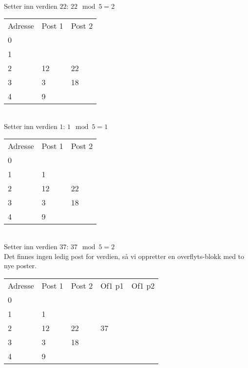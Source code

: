 ~\\
Setter inn verdien $22$: $22 \mod 5 = 2$\\
\begin{tabular}{|l|l|l|}
    \hline
    Adresse & Post 1 & Post 2 \\
    0       & ~      & ~      \\
    1       & ~      & ~      \\
    2       & 12     & 22     \\
    3       & 3      & 18     \\
    4       & 9      & ~      \\ \hline
\end{tabular}

~\\
Setter inn verdien $1$: $1 \mod 5 = 1$\\
\begin{tabular}{|l|l|l|}
    \hline
    Adresse & Post 1 & Post 2 \\
    0       & ~      & ~      \\
    1       & 1      & ~      \\
    2       & 12     & 22     \\
    3       & 3      & 18     \\
    4       & 9      & ~      \\ \hline
\end{tabular}

~\\
Setter inn verdien $37$: $37 \mod 5 = 2$\\
Det finnes ingen ledig post for verdien, så vi oppretter en overflyts-blokk med to nye poster.\\
\begin{tabular}{|l|l|l|l|l|}
    \hline
    Adresse & Post 1 & Post 2 & Of1 p1 & Of1 p2 \\
    0       & ~      & ~      &\cellcolor{gray}&\cellcolor{gray}\\
    1       & 1      & ~      &\cellcolor{gray}&\cellcolor{gray}\\
    2       & 12     & 22     & 37     & ~      \\
    3       & 3      & 18     &\cellcolor{gray}&\cellcolor{gray}\\
    4       & 9      & ~      &\cellcolor{gray}&\cellcolor{gray}\\ \hline
\end{tabular}

